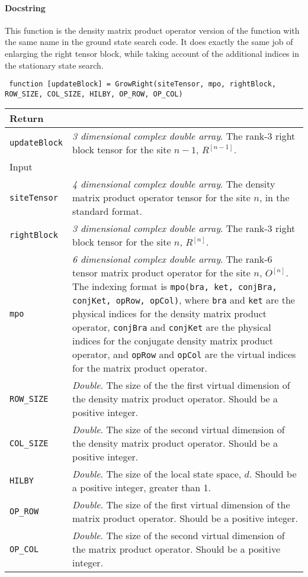  \paragraph{Docstring} This function is the density matrix product operator version of the function with the same name in the ground state search code. It does exactly the same job of enlarging the right tensor block, while taking account of the additional indices in the stationary state search.
 \begin{lstlisting}
 function [updateBlock] = GrowRight(siteTensor, mpo, rightBlock, ROW_SIZE, COL_SIZE, HILBY, OP_ROW, OP_COL) \end{lstlisting}
 \begin{longtabu}{X[1,l]X[4,l]}
 \hline
 Return & \\ \hline
 \lstinline$updateBlock$ & \emph{3 dimensional complex double array}. The rank-3 right block tensor for the site \(n - 1\), \(R^{[n-1]}\). \\ \hline
 Input & \\ \hline
 \lstinline$siteTensor$ & \emph{4 dimensional complex double array}. The density matrix product operator tensor for the site \(n\), in the standard format. \\
 \lstinline$rightBlock$ & \emph{3 dimensional complex double array}. The rank-3 right block tensor for the site \(n\), \(R^{[n]}\). \\
 \lstinline$mpo$ & \emph{6 dimensional complex double array}. The rank-6 tensor matrix product operator for the site \(n\), \(O^{[n]}\). The indexing format is \lstinline$mpo(bra, ket, conjBra, conjKet, opRow, opCol)$, where \lstinline$bra$ and \lstinline$ket$ are the physical indices for the density matrix product operator, \lstinline$conjBra$ and \lstinline$conjKet$ are the physical indices for the conjugate density matrix product operator, and \lstinline$opRow$ and \lstinline$opCol$ are the virtual indices for the matrix product operator. \\
 \lstinline$ROW_SIZE$ & \emph{Double}. The size of the the first virtual dimension of the density matrix product operator. Should be a positive integer. \\
 \lstinline$COL_SIZE$ & \emph{Double}. The size of the second virtual dimension of the density matrix product operator. Should be a positive integer. \\ 
 \lstinline$HILBY$ & \emph{Double}. The size of the local state space, \(d\). Should be a positive integer, greater than 1. \\
 \lstinline$OP_ROW$ & \emph{Double}. The size of the first virtual dimension of the matrix product operator. Should be a positive integer. \\
 \lstinline$OP_COL$ & \emph{Double}. The size of the second virtual dimension of the matrix product operator. Should be a positive integer. \\
 \hline
 \end{longtabu}
